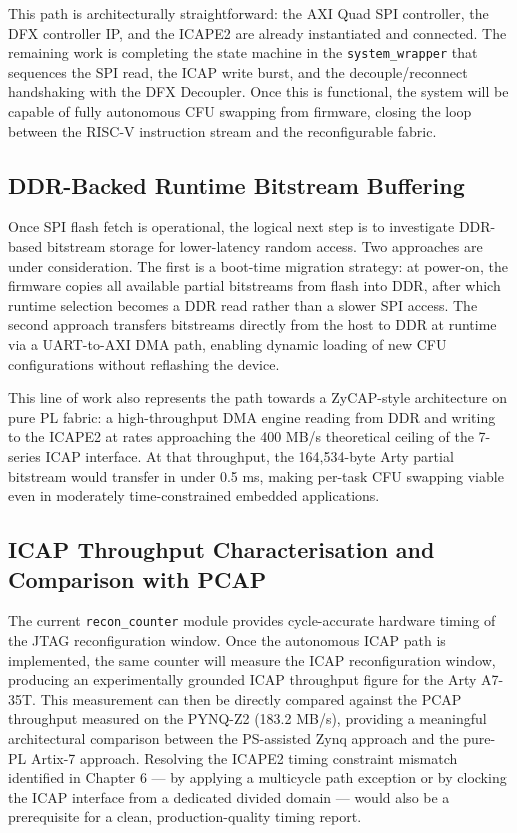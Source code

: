 This path is architecturally straightforward: the AXI Quad SPI controller, the DFX controller IP, and the ICAPE2 are already instantiated and connected. The remaining work is completing the state machine in the \texttt{system\_wrapper} that sequences the SPI read, the ICAP write burst, and the decouple/reconnect handshaking with the DFX Decoupler. Once this is functional, the system will be capable of fully autonomous CFU swapping from firmware, closing the loop between the RISC-V instruction stream and the reconfigurable fabric.

\subsection{DDR-Backed Runtime Bitstream Buffering}

Once SPI flash fetch is operational, the logical next step is to investigate DDR-based bitstream storage for lower-latency random access. Two approaches are under consideration. The first is a boot-time migration strategy: at power-on, the firmware copies all available partial bitstreams from flash into DDR, after which runtime selection becomes a DDR read rather than a slower SPI access. The second approach transfers bitstreams directly from the host to DDR at runtime via a UART-to-AXI DMA path, enabling dynamic loading of new CFU configurations without reflashing the device.

This line of work also represents the path towards a ZyCAP-style architecture on pure PL fabric: a high-throughput DMA engine reading from DDR and writing to the ICAPE2 at rates approaching the 400 MB/s theoretical ceiling of the 7-series ICAP interface. At that throughput, the 164,534-byte Arty partial bitstream would transfer in under 0.5 ms, making per-task CFU swapping viable even in moderately time-constrained embedded applications.

\subsection{ICAP Throughput Characterisation and Comparison with PCAP}

The current \texttt{recon\_counter} module provides cycle-accurate hardware timing of the JTAG reconfiguration window. Once the autonomous ICAP path is implemented, the same counter will measure the ICAP reconfiguration window, producing an experimentally grounded ICAP throughput figure for the Arty A7-35T. This measurement can then be directly compared against the PCAP throughput measured on the PYNQ-Z2 (183.2 MB/s), providing a meaningful architectural comparison between the PS-assisted Zynq approach and the pure-PL Artix-7 approach. Resolving the ICAPE2 timing constraint mismatch identified in Chapter 6 — by applying a multicycle path exception or by clocking the ICAP interface from a dedicated divided domain — would also be a prerequisite for a clean, production-quality timing report.

